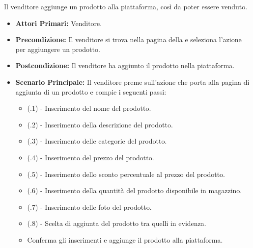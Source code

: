 

Il venditore aggiunge un prodotto alla piattaforma, così da poter essere venduto.
\begin{itemize}
    \item \textbf{Attori Primari:} Venditore.
    \item \textbf{Precondizione:} Il venditore si trova nella pagina della  e seleziona l'azione per aggiungere un prodotto.
    \item \textbf{Postcondizione:} Il venditore ha aggiunto il prodotto nella piattaforma.
    \item \textbf{Scenario Principale:} Il venditore preme sull'azione che porta alla pagina di aggiunta di un prodotto e compie i seguenti passi:
    \begin{itemize}
        \item (\actualUC.1) - Inserimento del nome del prodotto.
        \item (\actualUC.2) - Inserimento della descrizione del prodotto.
        \item (\actualUC.3) - Inserimento delle categorie del prodotto.
        \item (\actualUC.4) - Inserimento del prezzo del prodotto.
        \item (\actualUC.5) - Inserimento dello sconto percentuale al prezzo del prodotto.
        \item (\actualUC.6) - Inserimento della quantità del prodotto disponibile in magazzino.
        \item (\actualUC.7) - Inserimento delle foto del prodotto.
        \item (\actualUC.8) - Scelta di aggiunta del prodotto tra quelli in evidenza.
        \item Conferma gli inserimenti e aggiunge il prodotto alla piattaforma.
    \end{itemize}
\end{itemize}

